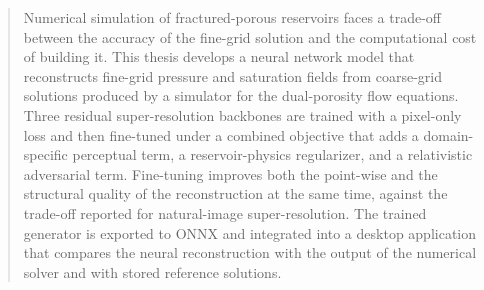\begin{abstract}


Numerical simulation of fractured-porous reservoirs faces a trade-off between the accuracy of the fine-grid solution and the computational cost of building it. This thesis develops a neural network model that reconstructs fine-grid pressure and saturation fields from coarse-grid solutions produced by a simulator for the dual-porosity flow equations. Three residual super-resolution backbones are trained with a pixel-only loss and then fine-tuned under a combined objective that adds a domain-specific perceptual term, a reservoir-physics regularizer, and a relativistic adversarial term. Fine-tuning improves both the point-wise and the structural quality of the reconstruction at the same time, against the trade-off reported for natural-image super-resolution. The trained generator is exported to ONNX and integrated into a desktop application that compares the neural reconstruction with the output of the numerical solver and with stored reference solutions.

\end{abstract}